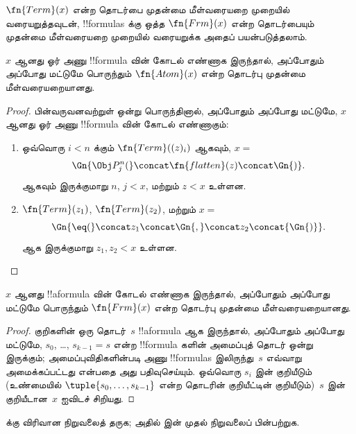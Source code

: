 \documentclass[../../../include/open-logic-section]{subfiles}
\begin{document}


$\fn{Term}(x)$ என்ற தொடர்பை முதன்மை மீள்வரையறை முறையில் வரையறுத்தவுடன்,
!!{formula}s க்கு ஒத்த $\fn{Frm}(x)$ என்ற தொடர்பையும் முதன்மை மீள்வரையறை
முறையில் வரையறுக்க அதைப் பயன்படுத்தலாம்.

\begin{prop}
$x$ ஆனது ஓர் அணு !!{formula} வின் கோடல் எண்ணாக இருந்தால், அப்போதும்
அப்போது மட்டுமே பொருந்தும் $\fn{Atom}(x)$ என்ற தொடர்பு முதன்மை
மீள்வரையறையானது.
\end{prop}

\begin{proof}
பின்வருவனவற்றுள் ஒன்று பொருந்தினால், அப்போதும் அப்போது மட்டுமே, $x$ ஆனது
ஓர் அணு !!{formula} வின் கோடல் எண்ணாகும்:
\begin{enumerate}
\item ஒவ்வொரு $i < n$ க்கும் $\fn{Term}((z)_i)$ ஆகவும், $x = $
\[
\Gn{\Obj P^n_j(} \concat \fn{flatten}(z) \concat \Gn{)}.
\]
  ஆகவும் இருக்குமாறு $n$, $j < x$, மற்றும் $z < x$ உள்ளன.
\item $\fn{Term}(z_1)$, $\fn{Term}(z_2)$, மற்றும் $x = $
\[
\Gn{{\eq}(} \concat z_1 \concat \Gn{,} \concat z_2 \concat{\Gn{)}}.
\]
  ஆக இருக்குமாறு $z_1, z_2 < x$ உள்ளன.
\end{enumerate}
\end{proof}

\begin{prop}
$x$ ஆனது !!a{formula} வின் கோடல் எண்ணாக இருந்தால், அப்போதும் அப்போது
மட்டுமே பொருந்தும் $\fn{Frm}(x)$ என்ற தொடர்பு முதன்மை மீள்வரையறையானது.
\end{prop}

\begin{proof}
குறிகளின் ஒரு தொடர்~$s$ !!a{formula} ஆக இருந்தால், அப்போதும் அப்போது
மட்டுமே, $s_0$, \dots, $s_{k-1} = s$ என்ற !!{formula} களின் அமைப்புத்
தொடர் ஒன்று இருக்கும்; அமைப்புவிதிகளின்படி அணு !!{formula}s இலிருந்து~$s$
எவ்வாறு அமைக்கப்பட்டது என்பதை அது பதிவுசெய்யும். ஒவ்வொரு $s_i$ இன்
குறியீடும் (உண்மையில் $\tuple{s_0, \dots, s_{k-1}}$ என்ற தொடரின்
குறியீட்டின் குறியீடும்)~$s$ இன் குறியீடான~$x$ ஐவிடச் சிறியது.
\end{proof}

\begin{prob}
 க்கு விரிவான நிறுவலைத் தருக;
அதில்  இன் முதல் நிறுவலைப்
பின்பற்றுக.
\end{prob}
\end{document}
